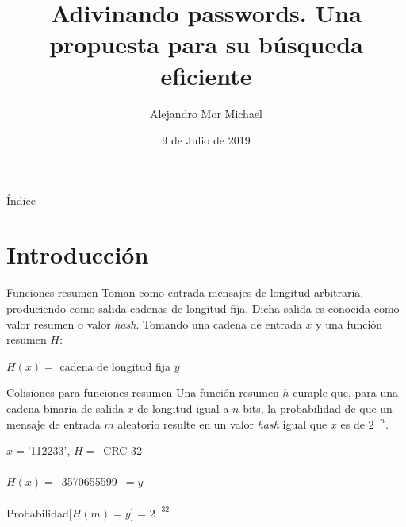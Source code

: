 \documentclass{beamer}
\title[Buscando colisiones de forma eficiente]{Adivinando passwords. Una propuesta para su búsqueda eficiente}
\author{Alejandro Mor Michael}
\date{9 de Julio de 2019}
\begin{document}
\maketitle

\begin{frame}{Índice}
	\tableofcontents
\end{frame}

\section{Introducción}

\begin{frame}{Funciones resumen}
	Toman como entrada mensajes de longitud arbitraria, produciendo como salida cadenas de longitud fija. Dicha salida es conocida como valor resumen o valor \textit{hash}. Tomando una cadena de entrada $x$ y una función resumen $H$:\\
	\begin{center}
		$H(x) = $ cadena de longitud fija $y$
	\end{center}
\end{frame}

\begin{frame}{Colisiones para funciones resumen}
	Una función resumen $h$ cumple que, para una cadena binaria de salida $x$ de longitud igual a $n$ bits, la probabilidad de que un mensaje de entrada $m$ aleatorio resulte en un valor \textit{hash} igual que $x$ es de $2^{-n}$.
	\begin{center}
		$x = $'112233', $H = $~CRC-32\\
		~\\
		$H(x) = $~3570655599~$ = y$\\
		~\\
		Probabilidad[$H(m) = y$] = $2^{-32}$
	\end{center}
\end{frame}
\end{document}
